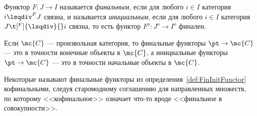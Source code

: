 \documentclass[
	extrafontsizes,
	11pt,
	hyphens,
]{memoir}
\begin{document}
\begin{definition}
Функтор \(F : J \to I\) называется \emph{финальным},%
\label{def:FinInitFunctor}
если для любого \(i \in I\) категория \(i \lsqdiv^F J\) связна,
и называется \emph{инициальным}, если для любого \(i \in I\) категория \(J \t[^F]{\lsqdiv}{} i\) связна, то есть функтор \(F^o : J^o \to I^o\) финален.
\end{definition}

\begin{example}
Если \(\mc{C}\) --- произвольная категория, то%
\label{exa:FinInitFunctAndObj}
финальные функторы \(\pt \to \mc{C}\) --- это в точности конечные объекты в \(\mc{C}\), а инициальные функторы \(\pt \to \mc{C}\) --- это в точности начальные объекты в \(\mc{C}\).
\end{example}


\begin{remark}
Некоторые называют
финальные функторы из определения~\ref{def:FinInitFunctor} кофинальными, следуя старомодному соглашению для направленных множеств, по которому <<кофинальное>> означает что-то вроде <<финальное в совокупности>>.
\end{remark}


\end{document}
